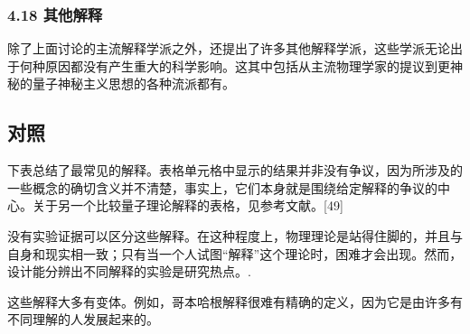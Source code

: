 \subsubsection{4.18 其他解释}

除了上面讨论的主流解释学派之外，还提出了许多其他解释学派，这些学派无论出于何种原因都没有产生重大的科学影响。这其中包括从主流物理学家的提议到更神秘的量子神秘主义思想的各种流派都有。

\subsection{对照}

下表总结了最常见的解释。表格单元格中显示的结果并非没有争议，因为所涉及的一些概念的确切含义并不清楚，事实上，它们本身就是围绕给定解释的争议的中心。关于另一个比较量子理论解释的表格，见参考文献。[49]

没有实验证据可以区分这些解释。在这种程度上，物理理论是站得住脚的，并且与自身和现实相一致；只有当一个人试图“解释”这个理论时，困难才会出现。然而，设计能分辨出不同解释的实验是研究热点。.

这些解释大多有变体。例如，哥本哈根解释很难有精确的定义，因为它是由许多有不同理解的人发展起来的。

